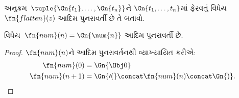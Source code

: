 \documentclass[../../../include/open-logic-section]{subfiles}
\begin{document}
\begin{prob}
અનુક્રમ~$\tuple{\Gn{t_1}, \dots, \Gn{t_n}}$ને
$\Gn{t_1, \dots, t_n}$માં ફેરવતું
વિધેય~$\fn{flatten}(z)$ આદિમ
પુનરાવર્તી છે તે બતાવો.
\end{prob}

\begin{prop}
  વિધેય~$\fn{num}(n) = \Gn{\num{n}}$ આદિમ પુનરાવર્તી છે.
\end{prop}

\begin{proof}
  $\fn{num}(n)$ને આદિમ પુનરાવર્તનથી વ્યાખ્યાયિત કરીએ:
  \begin{align*}
    \fn{num}(0) & = \Gn{\Obj 0}\\
    \fn{num}(n+1) & = \Gn{\prime(} \concat \fn{num}(n) \concat \Gn{)}.
  \end{align*}
\end{proof}
\end{document}
